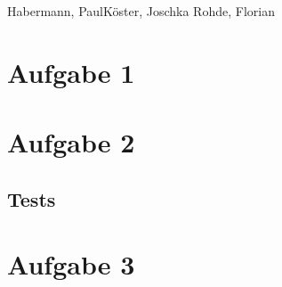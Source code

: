 \documentclass{ti2}
\begin{document}

%
                {Habermann, Paul}{K\"{o}ster, Joschka}%
                {Rohde, Florian}{}%


\section{Aufgabe 1}

\clearpage
\section{Aufgabe 2}

\clearpage
\subsection{Tests}

\clearpage
\section{Aufgabe 3}
\end{document}
